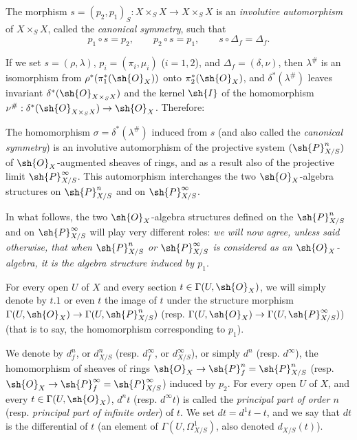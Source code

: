 \begin{env}[16.3.3]
\label{IV.16.3.3}
The morphism $s = (p_2, p_1)_S: X \times_S X \to X \times_S X$ is an \emph{involutive automorphism} of $X \times_S X$, called the \emph{canonical symmetry}, such that
\[
  \label{IV.16.3.3.1}
  p_1 \circ s = p_2, \qquad p_2 \circ s = p_1, \qquad s \circ \Delta_f = \Delta_f.
  \tag{16.3.3.1}
\]

If we set $s=(\rho,\lambda)$, $p_i=(\pi_i,\mu_i)$ ($i=1,2$), and $\Delta_f=(\delta,\nu)$, then $\lambda^\#$ is an isomorphism from $\rho^*(\pi_1^*(\sh{O}_X))$ onto $\pi_2^*(\sh{O}_X)$, and $\delta^*(\lambda^\#)$ leaves invariant $\delta^*(\sh{O}_{X\times_S X})$ and the kernel $\sh{I}$ of the homomorphism $\nu^\#: \delta^*(\sh{O}_{X\times_S X})\to\sh{O}_X$.
Therefore:
\end{env}

\begin{proposition}[16.3.4]
\label{IV.16.3.4}
The homomorphism $\sigma = \delta^*(\lambda^\#)$ induced from $s$ (and also called the \emph{canonical symmetry}) is an involutive automorphism of the projective system $(\sh{P}_{X/S}^n)$ of $\sh{O}_X$-augmented 
sheaves of rings, and as a result also of the projective limit $\sh{P}_{X/S}^\infty$.
This automorphism interchanges the two $\sh{O}_X$-algebra structures on $\sh{P}_{X/S}^n$ and on $\sh{P}_{X/S}^\infty$.
\end{proposition}

\begin{env}[16.3.5]
\label{IV.16.3.5}
In what follows, the two $\sh{O}_X$-algebra structures defined on the $\sh{P}_{X/S}^n$ and on $\sh{P}_{X/S}^\infty$ will play very different roles:
\emph{we will now agree, unless said otherwise, that when $\sh{P}_{X/S}^n$ or $\sh{P}_{X/S}^\infty$ is considered as an $\sh{O}_X$-algebra, it is the algebra structure induced by $p_1$}.
\end{env}

For every open $U$ of $X$ and every section $t \in \Gamma(U, \sh{O}_X)$, we will simply denote by $t.1$ or even $t$ the image of $t$ under the structure morphism $\Gamma(U, \sh{O}_X) \to \Gamma(U, \sh{P}_{X/S}^n)$ (resp. $\Gamma(U, \sh{O}_X) \to \Gamma(U, \sh{P}_{X/S}^\infty)$) (that is to say, the homomorphism corresponding to $p_1$).

\begin{definition}[16.3.6]
\label{IV.16.3.6}
We denote by $d_f^n$, or $d_{X/S}^n$ (resp. $d_f^\infty$, or $d_{X/S}^\infty$), or simply $d^n$ (resp. $d^\infty$), the homomorphism of sheaves of rings $\sh{O}_X \to \sh{P}_{f}^n = \sh{P}_{X/S}^n$ (resp. $\sh{O}_X \to \sh{P}_{f}^\infty = \sh{P}_{X/S}^\infty$) induced by $p_2$.
For every open $U$ of $X$, and every $t \in \Gamma(U, \sh{O}_X)$, $d^n t$ (resp. $d^\infty t$) is called the \emph{principal part of order $n$} (resp. \emph{principal part of infinite order}) of $t$.
We set $dt = d^1 t - t$, and we say that $dt$ is the differential of $t$ (an element of $\Gamma(U, \Omega_{X/S}^1)$, also denoted $d_{X/S}(t)$).
\end{definition}  

